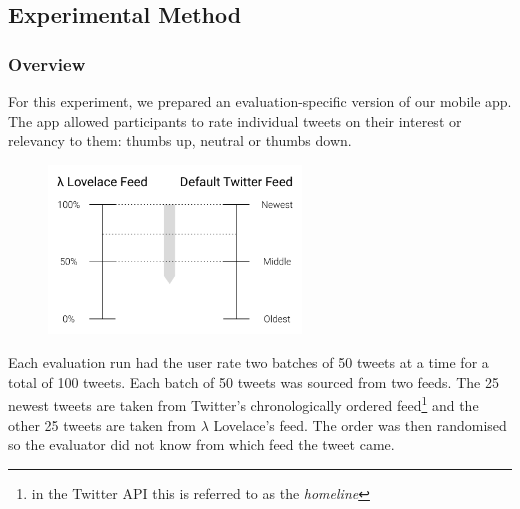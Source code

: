 \documentclass{article}
\begin{document}
\subsection{Experimental Method}
\subsubsection*{Overview} %
%
%

For this experiment, we prepared an evaluation-specific version of our mobile app. The app allowed participants to rate individual tweets on their interest or relevancy to them: thumbs up, neutral or thumbs down.

\begin{figure}[H]
    \includegraphics[width=0.6\textwidth, center]{evaluations_1}
\end{figure}


\newpage


\noindent Each evaluation run had the user rate two batches of 50 tweets at a time for a total of 100 tweets. Each batch of 50 tweets was sourced from two feeds. The 25 newest tweets are taken from Twitter's chronologically ordered feed\footnote{in the Twitter API this is referred to as the \textit{homeline}} and the other 25 tweets are taken from $\lambda$ Lovelace's feed. The order was then randomised so the evaluator did not know from which feed the tweet came.
\end{document}
